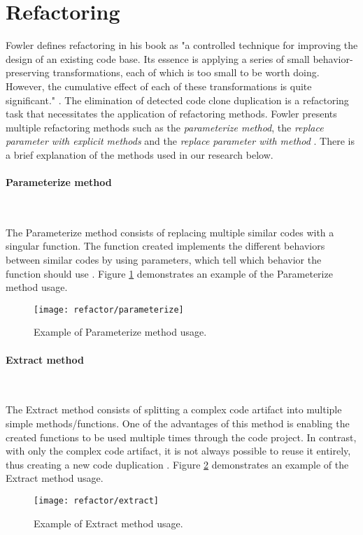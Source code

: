 \en

\section{Refactoring}

Fowler defines refactoring in his book as "a controlled technique for improving the design of an existing code base. 
Its essence is applying a series of small behavior-preserving transformations, each of which is too small to be worth 
doing. However, the cumulative effect of each of these transformations is quite significant." \citep{refactorbook}. 
The elimination of detected code clone duplication is a refactoring task that necessitates the 
application of refactoring methods. Fowler presents multiple refactoring methods such as the 
\textit{parameterize method}, the \textit{replace parameter with explicit methods} and 
the \textit{replace parameter with method} \citep{refactorbook}. 
There is a brief explanation of the methods used in our research below.

\paragraph{Parameterize method}

\

The Parameterize method consists of replacing multiple similar codes with a singular function. 
The function created implements the different behaviors between similar codes by using parameters, 
which tell which behavior the function should use \citep{refactorbook}.
Figure \ref{fig:parameter} demonstrates an example of the Parameterize method usage.

\begin{figure}
\texttt{[image: refactor/parameterize]}
\caption{Example of Parameterize method usage.}
\label{fig:parameter}
\end{figure}


\paragraph{Extract method}

\

The Extract method consists of splitting a complex code artifact into multiple simple methods/functions. 
One of the advantages of this method is enabling the created functions to be used multiple times through 
the code project. In contrast, with only the complex code artifact, it is not always possible to reuse 
it entirely, thus creating a new code duplication \citep{refactorbook}. 
Figure \ref{fig:extract} demonstrates an example of the Extract method usage.

\begin{figure}
\texttt{[image: refactor/extract]}
\caption{Example of Extract method usage.}
\label{fig:extract}
\end{figure}

